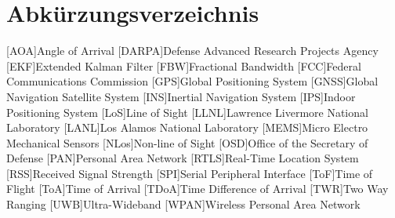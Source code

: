 \chapter*{Abkürzungsverzeichnis}
\begin{acronym}
		
	[AOA]{Angle of Arrival}
	[DARPA]{Defense Advanced Research Projects Agency}
	[EKF]{Extended Kalman Filter}
	[FBW]{Fractional Bandwidth}
	[FCC]{Federal Communications Commission}
	[GPS]{Global Positioning System}
	[GNSS]{Global Navigation Satellite System}
	[INS]{Inertial Navigation System}
	[IPS]{Indoor Positioning System}
	[LoS]{Line of Sight}
	[LLNL]{Lawrence Livermore National Laboratory}
	[LANL]{Los Alamos National Laboratory}
	[MEMS]{Micro Electro Mechanical Sensors}
	[NLos]{Non-line of Sight}
	[OSD]{Office of the Secretary of Defense}
	[PAN]{Personal Area Network}
	[RTLS]{Real-Time Location System}
	[RSS]{Received Signal Strength}
	[SPI]{Serial Peripheral Interface}
	[ToF]{Time of Flight}
	[ToA]{Time of Arrival}
	[TDoA]{Time Difference of Arrival}
	[TWR]{Two Way Ranging}
	[UWB]{Ultra-Wideband} %
	[WPAN]{Wireless Personal Area Network}

\end{acronym}
